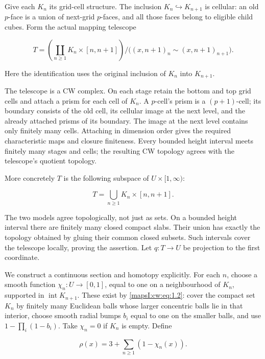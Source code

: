 Give each \(K_n\) its grid-cell structure. The inclusion \(K_n\hookrightarrow K_{n+1}\) is cellular: an old \(p\)-face is a union of next-grid \(p\)-faces, and all those faces belong to eligible child cubes. Form the actual mapping telescope

\begin{equation}
T=\left(\coprod_{n\geq1}K_n\times[n,n+1]\right)\big/\bigl((x,n+1)_n\sim(x,n+1)_{n+1}\bigr).
\label{mapsI:cw:eq:1.3}
\end{equation}

Here the identification uses the original inclusion of \(K_n\) into \(K_{n+1}\).

The telescope is a CW complex. On each stage retain the bottom and top grid cells and attach a prism for each cell of \(K_n\). A \(p\)-cell's prism is a \((p+1)\)-cell; its boundary consists of the old cell, its cellular image at the next level, and the already attached prisms of its boundary. The image at the next level contains only finitely many cells. Attaching in dimension order gives the required characteristic maps and closure finiteness. Every bounded height interval meets finitely many stages and cells; the resulting CW topology agrees with the telescope's quotient topology.

More concretely \(T\) is the following subspace of \(U\times[1,\infty)\):

\begin{equation}
T=\bigcup_{n\geq1}K_n\times[n,n+1].
\label{mapsI:cw:eq:1.4}
\end{equation}

The two models agree topologically, not just as sets. On a bounded height interval there are finitely many closed compact slabs. Their union has exactly the topology obtained by gluing their common closed subsets. Such intervals cover the telescope locally, proving the assertion. Let \(q:T\to U\) be projection to the first coordinate.

We construct a continuous section and homotopy explicitly. For each \(n\), choose a smooth function \(\chi_n:U\to[0,1]\), equal to one on a neighbourhood of \(K_n\), supported in \(\operatorname{int}K_{n+1}\). These exist by \eqref{mapsI:cw:eq:1.2}: cover the compact set \(K_n\) by finitely many Euclidean balls whose larger concentric balls lie in that interior, choose smooth radial bumps \(b_i\) equal to one on the smaller balls, and use \(1-\prod_i(1-b_i)\). Take \(\chi_n=0\) if \(K_n\) is empty. Define

\begin{equation}
\rho(x)=3+\sum_{n\geq1}(1-\chi_n(x)).
\label{mapsI:cw:eq:1.5}
\end{equation}

